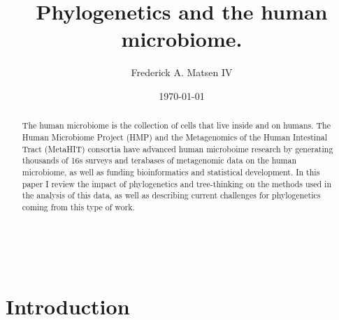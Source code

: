 \documentclass{amsart}
\newcommand{\forarxiv}[1]{#1}
\newcommand{\notforarxiv}[1]{}
\begin{document}
\notforarxiv{
\begin{flushright}
Version dated: \today
\end{flushright}
\bigskip
\noindent RH: PHYLOGENETICS AND THE HUMAN MICROBIOME
\bigskip
\medskip
\begin{center}

\noindent{\Large \bf Phylogenetics and the human microbiome.}
\bigskip

\noindent {\normalsize \sc
Frederick A. Matsen IV$^1$}\\
\noindent {\small \it
$^1$
Program in Computational Biology, Fred Hutchinson Cancer Research Center, Seattle, WA, 91802, USA}\\
\end{center}
\medskip
\noindent{\bf Corresponding author:} Frederick A Matsen, Program in Computational Biology, Fred Hutchinson Cancer Research Center, Seattle, WA, 91802, USA; E-mail: matsen@fhcrc.org.\\
\vspace{1in}
}

\forarxiv{\
\title{Phylogenetics and the human microbiome.}
\author{Frederick A. Matsen IV}
\date{\today}
\begin{abstract}
}
\notforarxiv{
\subsubsection{Abstract}
}

The human microbiome is the collection of cells that live inside and on humans.
The Human Microbiome Project (HMP) and the Metagenomics of the Human Intestinal Tract (MetaHIT) consortia have advanced human microboime research by generating thousands of 16s surveys and terabases of metagenomic data on the human microbiome, as well as funding bioinformatics and statistical development.
In this paper I review the impact of phylogenetics and tree-thinking on the methods used in the analysis of this data, as well as describing current challenges for phylogenetics coming from this type of work.

\forarxiv{
\end{abstract}
\maketitle

\section{Introduction}
}
\end{document}
